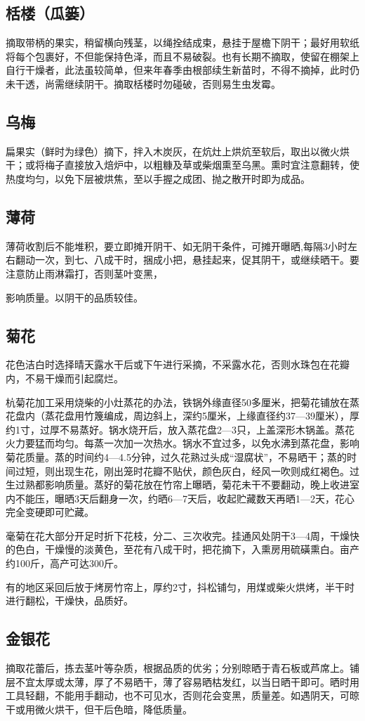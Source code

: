 \documentclass{ctexbook}
\begin{document}
\subsection{栝楼（瓜篓）}
摘取带柄的果实，稍留横向残茎，以绳拴结成束，悬挂于屋檐下阴干；最好用软纸将每个包裹好，不但能保持色泽，而且不易破裂。也有长期不摘取，使留在棚架上自行干燥者，此法虽较简单，但来年春季由根部续生新苗时，不得不摘掉，此时仍未干透，尚需继续阴干。摘取栝楼时勿碰破，否则易生虫发霉。
\subsection{乌梅}
扁果实（鲜时为绿色）摘下，拌入木炭灰，在炕灶上烘炕至软后，取出以微火烘干；或将梅子直接放入焙炉中，以粗糠及草或柴烟熏至乌黑。熏时宜注意翻转，使热度均匀，以免下层被烘焦，至以手握之成团、抛之散开时即为成品。
\subsection{薄荷}
薄荷收割后不能堆积，要立即摊开阴干、如无阴干条件，可摊开曝晒,每隔3小时左右翻动一次，到七、八成干时，捆成小把，悬挂起来，促其阴干，或继续晒干。要注意防止雨淋霜打，否则茎叶变黑，

影响质量。以阴干的品质较佳。
\subsection{菊花}
花色洁白时选择晴天露水干后或下午进行采摘，不采露水花，否则水珠包在花瓣内，不易干燥而引起腐烂。

杭菊花加工采用烧柴的小灶蒸花的办法，铁锅外缘直径50多厘米，把菊花铺放在蒸花盘内（蒸花盘用竹篾编成，周边斜上，深约5厘米，上缘直径约37—39厘米），厚约1寸，过厚不易蒸好。锅水烧开后，放入蒸花盘2—3只，上盖深形木锅盖。蒸花火力要猛而均匀。每蒸一次加一次热水。锅水不宜过多，以免水沸到蒸花盘，影响菊花质量。蒸的时间约4—4.5分钟，过久花熟过头成“湿腐状”，不易晒干；蒸的时间过短，则出现生花，刚出笼时花瓣不贴伏，颜色灰白，经风一吹则成红褐色。过生过熟都影响质量。蒸好的菊花放在竹帘上曝晒，菊花未干不要翻动，晚上收进室内不能压，曝晒3天后翻身一次，约晒6—7天后，收起贮藏数天再晒1—2天，花心完全变硬即可贮藏。

毫菊在花大部分开足时折下花枝，分二、三次收完。挂通风处阴干3—4周，干燥快的色白，干燥慢的淡黄色，至花有八成干时，把花摘下，入熏房用硫磺熏白。亩产约100斤，高产可达300斤。

有的地区采回后放于烤房竹帘上，厚约2寸，抖松铺匀，用煤或柴火烘烤，半干时进行翻松，干燥快，品质好。
\subsection{金银花}
摘取花蕾后，拣去茎叶等杂质，根据品质的优劣；分别晾晒于青石板或芦席上。铺层不宜太厚或太薄，厚了不易晒干，薄了容易晒枯发红，以当日晒干即可。晒时用工具轻翻，不能用手翻动，也不可见水，否则花会变黑，质量差。如遇阴天，可晾干或用微火烘干，但干后色暗，降低质量。
\end{document}
